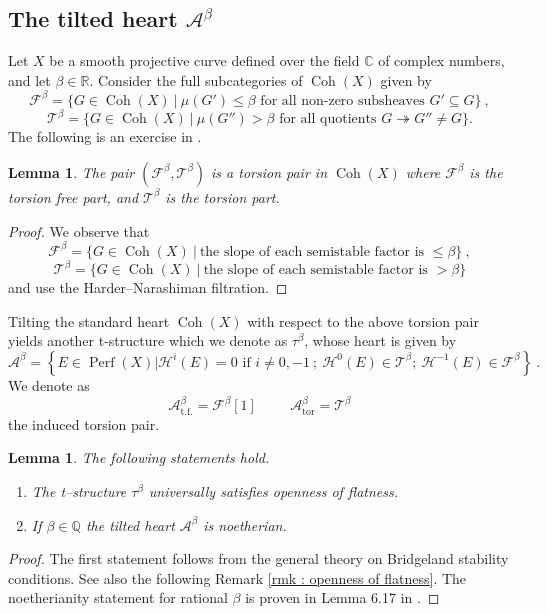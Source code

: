 \documentclass[11pt]{article}
\newtheorem{lemma}[theorem]{Lemma}
\newcommand{\BR}{\mathbb{R}}
\newcommand{\BC}{\mathbb{C}}
\newcommand{\BQ}{\mathbb{Q}}
\newcommand{\fbeta}{\mathcal{F}^{\beta}}
\newcommand{\tbeta}{\mathcal{T}^{\beta}}
\newcommand{\abeta}{\mathcal{A}^{\beta}}
\newcommand{\abetator}{\mathcal{A}^{\beta}_{\operatorname{tor}}}
\newcommand{\abetatf}{\mathcal{A}^{\beta}_{\operatorname{t.f.}}}
\newcommand{\coh}{\operatorname{Coh}}
\newcommand{\perf}{\operatorname{Perf}(X)}
\begin{document}
\subsection{The tilted heart $\abeta$ }\label{subsec : tilted heart abeta}
Let $X$ be a smooth projective curve defined over the field $\BC$ of complex numbers, and let $\beta\in \BR$. Consider the full subcategories of $\coh(X)$ given by
\begin{equation} \label{eqn : fbetatbeta}
\mathcal{F}^{\beta}=\{ G\in \operatorname{Coh}(X) \ |\ \mu(G')\leq \beta \text{ for all non-zero subsheaves } G'\subseteq G \} \ ,
\end{equation}
\[
\mathcal{T}^{\beta}=\{ G\in \operatorname{Coh}(X) \ |\ \mu(G'') > \beta \text{ for all quotients } G \twoheadrightarrow G''\neq G \}.
\]
\noindent The following is an exercise in \cite{jardim2025stabilityconditionscoherentsystems}.

\begin{lemma}\label{lemma : torsion pair proof}
     The pair $(\mathcal{F}^{\beta}, \mathcal{T}^{\beta})$ is a torsion pair in $\operatorname{Coh}(X)$ 
where $\mathcal{F}^{\beta}$ is the torsion free part, and $\mathcal{T}^{\beta}$ is the torsion part.
\end{lemma}
\begin{proof}
    We observe that
    \[
\mathcal{F}^{\beta}=\{ G\in \operatorname{Coh}(X) \ |\ \text{the slope of each semistable factor is } \leq \beta \} \ ,
\]
\[
\mathcal{T}^{\beta}=\{ G\in \operatorname{Coh}(X) \ |\ \text{the slope of each semistable factor is } > \beta \}
\]
and use the Harder--Narashiman filtration.
\end{proof}


\noindent  Tilting the standard heart $\coh(X)$ with respect to the above torsion pair yields another t-structure which we denote as $\tau^\beta$, whose heart is given by 
\begin{equation}
    \mathcal{A}^{\beta} = \left\{E\in \perf \Big|  \mathcal{H}^i(E) =0 \text{ if } i\neq 0,-1 \ ; \ \mathcal{H}^0(E) \in \mathcal{T}^{\beta} ; \ \mathcal{H}^{-1}(E) \in \mathcal{F}^{\beta}  
    \right\} \ .
\end{equation}
\noindent We denote as
\[
    \abetatf= \fbeta[1] \hspace{1cm} \abetator = \tbeta 
\]
the induced torsion pair.

\begin{lemma}\label{lemma : notherianity}
The following statements hold.
\begin{enumerate}
    \item  The  t--structure $\tau^{\beta}$ universally satisfies openness of flatness.
    \item If $\beta \in \BQ$ the tilted heart $\abeta$ is noetherian.
\end{enumerate}
\end{lemma}
\begin{proof}
The first statement follows from the general theory on Bridgeland stability conditions. See also the following Remark \ref{rmk : openness of flatness}. The noetherianity statement for rational $\beta$ is proven in Lemma 6.17 in \cite{macri2019lecturesbridgelandstability}. 
\end{proof}
\end{document}
